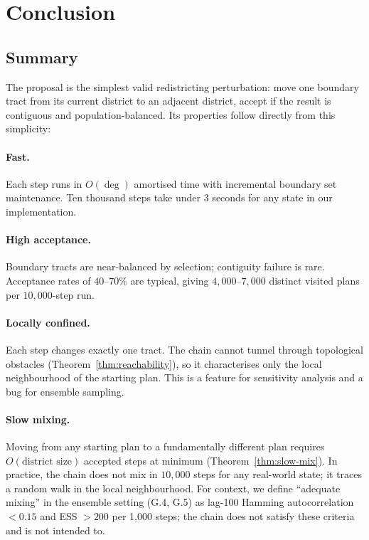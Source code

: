 \section{Conclusion}
\label{sec:conclusion}

\subsection{Summary}

The \flip{} proposal is the simplest valid redistricting perturbation: move
one boundary tract from its current district to an adjacent district, accept
if the result is contiguous and population-balanced.
Its properties follow directly from this simplicity:

\paragraph{Fast.}
Each step runs in $O(\deg)$ amortised time with incremental boundary set
maintenance.
Ten thousand steps take under 3 seconds for any state in our implementation.

\paragraph{High acceptance.}
Boundary tracts are near-balanced by selection; contiguity failure is rare.
Acceptance rates of $40$--$70\%$ are typical, giving $4{,}000$--$7{,}000$
distinct visited plans per $10{,}000$-step run.

\paragraph{Locally confined.}
Each \flip{} step changes exactly one tract.
The chain cannot tunnel through topological obstacles (Theorem~\ref{thm:reachability}),
so it characterises only the local neighbourhood of the starting plan.
This is a feature for sensitivity analysis and a bug for ensemble sampling.

\paragraph{Slow mixing.}
Moving from any starting plan to a fundamentally different plan requires
$O(\text{district size})$ accepted steps at minimum (Theorem~\ref{thm:slow-mix}).
In practice, the chain does not mix in $10{,}000$ steps for any real-world
state; it traces a random walk in the local neighbourhood.
For context, we define ``adequate mixing'' in the ensemble setting (G.4, G.5)
as lag-100 Hamming autocorrelation $< 0.15$ and ESS $> 200$ per 1{,}000 steps;
the \flip{} chain does not satisfy these criteria and is not intended to.

